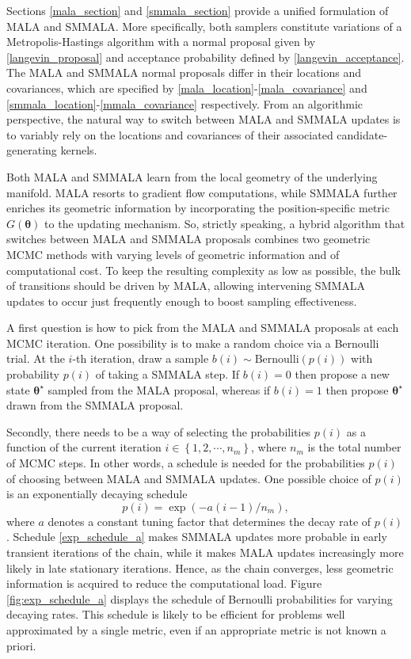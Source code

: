 \documentclass[twoside,11pt]{article}
\begin{document}
Sections \ref{mala_section} and \ref{smmala_section} provide a unified formulation of MALA and SMMALA. More specifically, 
both samplers constitute variations of a Metropolis-Hastings algorithm with a normal proposal given by 
\eqref{langevin_proposal} and acceptance probability defined by \eqref{langevin_acceptance}. The MALA and SMMALA normal 
proposals differ in their locations and covariances, which are specified by \eqref{mala_location}-\eqref{mala_covariance} 
and \eqref{smmala_location}-\eqref{mmala_covariance} respectively. From an algorithmic perspective, the natural way to 
switch between MALA and SMMALA updates is to variably rely on the locations and covariances of their associated 
candidate-generating kernels.

Both MALA and SMMALA learn from the local geometry of the underlying manifold. MALA resorts to gradient flow computations, 
while SMMALA further enriches its geometric information by incorporating the position-specific metric 
$G(\boldsymbol{\theta})$ to the updating mechanism. So, strictly speaking, a hybrid algorithm that switches between MALA and 
SMMALA proposals combines two geometric MCMC methods with varying levels of geometric information and of computational cost. 
To keep the resulting complexity as low as possible, the bulk of transitions should be driven by MALA, allowing intervening 
SMMALA updates to occur just frequently enough to boost sampling effectiveness.

A first question is how to pick from the MALA and SMMALA proposals at each MCMC iteration. One possibility is to make a
random choice via a Bernoulli trial. At the $i$-th iteration, draw a sample $b(i)\sim \mbox{Bernoulli}(p(i))$ with
probability $p(i)$ of taking a SMMALA step. If $b(i)=0$ then propose a new state $\boldsymbol{\theta}^{\star}$ sampled from
the MALA proposal, whereas if $b(i)=1$ then propose $\boldsymbol{\theta}^{\star}$ drawn from the SMMALA proposal.

Secondly, there needs to be a way of selecting the probabilities $p(i)$ as a function of the current iteration
$i\in\left\{1,2,\cdots,n_m\right\}$, where $n_m$ is the total number of MCMC steps. In other words, a schedule is needed for
the probabilities $p(i)$ of choosing between MALA and SMMALA updates. One possible choice of $p(i)$ is an exponentially 
decaying schedule
\begin{equation}
\label{exp_schedule_a}
p(i)=\exp{(-a(i-1)/n_m)},
\end{equation}
where $a$ denotes a constant tuning factor that determines the decay rate of $p(i)$.
Schedule \eqref{exp_schedule_a} makes SMMALA updates more probable in early transient iterations of the chain, while it 
makes MALA updates increasingly more likely in late stationary iterations. Hence, as the chain converges, less geometric 
information is acquired to reduce the computational load. Figure \ref{fig:exp_schedule_a} displays the schedule of Bernoulli 
probabilities for varying decaying rates.  This schedule is likely to be efficient for problems well approximated by a 
single metric, even if an appropriate metric is not known a priori.
\end{document}

